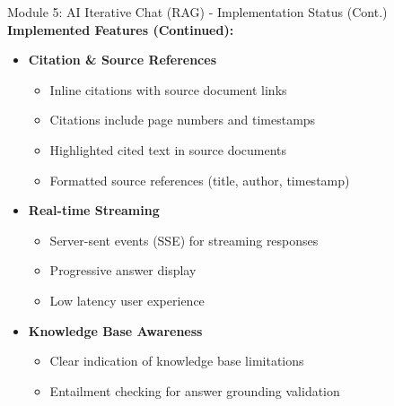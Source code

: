 \documentclass[aspectratio=169,xcolor=dvipsnames]{beamer}
\begin{document}
\begin{frame}{Module 5: AI Iterative Chat (RAG) - Implementation Status (Cont.)}
    \large
    \textbf{Implemented Features (Continued):}
    \begin{itemize}
        \item \checkmark \textbf{Citation \& Source References}
        \begin{itemize}
            \normalsize
            \item Inline citations with source document links
            \item Citations include page numbers and timestamps
            \item Highlighted cited text in source documents
            \item Formatted source references (title, author, timestamp)
        \end{itemize}
        
        \vspace{0.5em}
        \item \checkmark \textbf{Real-time Streaming}
        \begin{itemize}
            \normalsize
            \item Server-sent events (SSE) for streaming responses
            \item Progressive answer display
            \item Low latency user experience
        \end{itemize}
        
        \vspace{0.5em}
        \item \checkmark \textbf{Knowledge Base Awareness}
        \begin{itemize}
            \normalsize
            \item Clear indication of knowledge base limitations
            \item Entailment checking for answer grounding validation
        \end{itemize}
    \end{itemize}
\end{frame}
\end{document}
